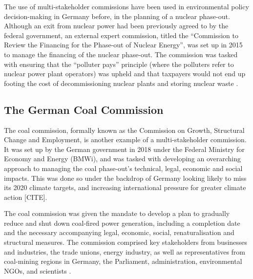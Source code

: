 \documentclass[12pt,onecolumn,twoside]{layout}
\begin{document}
The use of multi-stakeholder commissions have been used in environmental policy decision-making in Germany before, in the planning of a nuclear phase-out. Although an exit from nuclear power had been previously agreed to by the federal government, an external expert commission, titled the ``Commission to Review the Financing for the Phase-out of Nuclear Energy'', was set up in 2015 to manage the financing of the nuclear phase-out. The commission was tasked with ensuring that the ``polluter pays'' principle (where the polluters refer to nuclear power plant operators) was upheld and that taxpayers would not end up footing the cost of decommissioning nuclear plants and storing nuclear waste \cite{Appunn2017}. 

\subsection*{The German Coal Commission}
The coal commission, formally known as the Commission on Growth, Structural Change and Employment, is another example of a multi-stakeholder commission. It was set up by the German government in 2018 under the Federal Ministry for Economy and Energy (BMWi), and was tasked with developing an overarching approach to managing the coal phase-out’s technical, legal, economic and social impacts. This was done so under the backdrop of Germany looking likely to miss its 2020 climate targets, and increasing international pressure for greater climate action [CITE]. 

The coal commission was given the mandate to develop a plan to gradually reduce and shut down coal-fired power generation, including a completion date and the necessary accompanying legal, economic, social, renaturalisation and structural measures. \cite{Groll2019} The commission comprised key stakeholders from businesses and industries, the trade unions, energy industry, as well as representatives from coal-mining regions in Germany, the Parliament, administration, environmental NGOs, and scientists \cite{AgoraEnergiewende2019}. 
\end{document}
